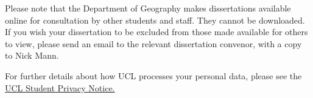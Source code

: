 \vfill

{\noindent\scriptsize%
Please note that the Department of Geography makes dissertations available online for consultation by other students and staff. They cannot be downloaded. If you wish your dissertation to be excluded from those made available for others to view, please send an email to the relevant dissertation convenor, with a copy to Nick Mann.

\noindent 
For further details about how UCL processes your personal data, please see the \href{https://www.ucl.ac.uk/legal-services/privacy/ucl-student-privacy}{UCL Student Privacy Notice.}
\par}

